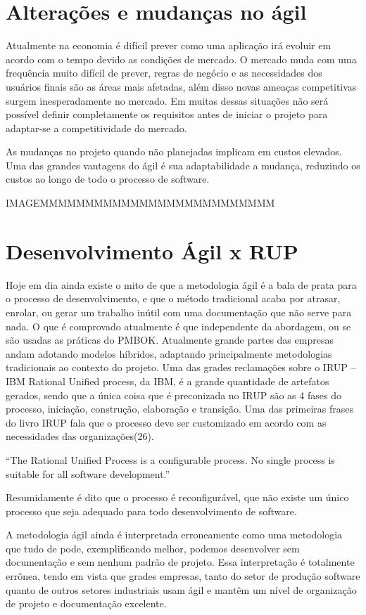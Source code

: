 \section{Alterações e mudanças no ágil}

Atualmente na economia é difícil prever como uma aplicação irá evoluir em acordo com o tempo devido as condições de mercado. O mercado muda com uma frequência muito difícil de prever, regras de negócio e as necessidades dos usuários finais são as áreas mais afetadas, além disso novas ameaças competitivas surgem inesperadamente no mercado. Em muitas dessas situações não será possível definir completamente os requisitos antes de iniciar o projeto para adaptar-se a competitividade do mercado.

As mudanças no projeto quando não planejadas implicam em custos elevados. Uma das grandes vantagens do ágil é sua adaptabilidade a mudança, reduzindo os custos ao longo de todo o processo de software.

IMAGEMMMMMMMMMMMMMMMMMMMMMMMMMM

\section{Desenvolvimento Ágil x RUP}

Hoje em dia ainda existe o mito de que a metodologia ágil é a bala de prata para o processo de desenvolvimento, e que o método tradicional acaba por atrasar, enrolar, ou gerar um trabalho inútil com uma documentação que não serve para nada. O que é comprovado atualmente é que independente da abordagem, ou se são usadas as práticas do PMBOK.
Atualmente grande partes das empresas andam adotando modelos híbridos, adaptando principalmente metodologias tradicionais ao contexto do projeto. Uma das grades reclamações sobre o IRUP – IBM Rational Unified process, da IBM, é a grande quantidade de artefatos gerados, sendo que a única coisa que é preconizada no IRUP são as 4 fases do processo, iniciação, construção, elaboração e transição. Uma das primeiras frases do livro IRUP fala que o processo deve ser customizado em acordo com as necessidades das organizações(26).

“The Rational Unified Process is a configurable process. No single process is suitable for all software development.”

Resumidamente é dito que o processo é reconfigurável, que não existe um único processo que seja adequado para todo desenvolvimento de software.

A metodologia ágil ainda é interpretada erroneamente como uma metodologia que tudo de pode, exemplificando melhor, podemos desenvolver sem documentação e sem nenhum padrão de projeto. Essa interpretação é totalmente errônea, tendo em vista que grades empresas, tanto do setor de produção software quanto de outros setores industriais usam ágil e mantêm um nível de organização de projeto e documentação excelente.

